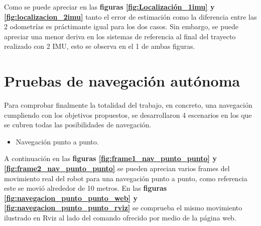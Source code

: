 Como se puede apreciar en las \textbf{figuras \ref{fig:Localización_1imu} y \ref{fig:localizacion_2imu}} tanto el error de estimación como la diferencia entre las 
2 odometrías es práctimante igual para los dos casos. Sin embargo, se puede apreciar una menor deriva en los sistemas de referencia al final del 
trayecto realizado con 2 IMU, esto se observa en el 1 de ambas figuras.
\newpage
\section{Pruebas de navegación autónoma}

Para comprobar finalmente la totalidad del trabajo, en concreto, una navegación cumpliendo con los objetivos propuestos, se desarrollaron 4 escenarios en los que se cubren todas 
las posibilidades de navegación.
\begin{itemize}
  \item Navegación punto a punto.
\end{itemize}
A continuación en las \textbf{figuras \ref{fig:frame1_nav_punto_punto} y \ref{fig:frame2_nav_punto_punto}} se pueden aprecian varios frames del movimiento real del robot para una navegación punto a punto, como referencia este se movió alrededor de 10 metros. En 
las \textbf{figuras \ref{fig:navegacion_punto_punto_web} y \ref{fig:navegacion_punto_punto_rviz}} se comprueba el mismo movimiento ilustrado en Rviz al lado del comando ofrecido por medio de la página web.

